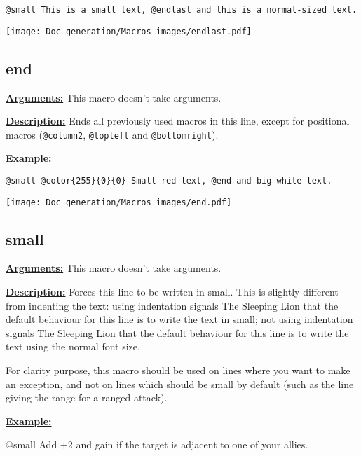 \documentclass{article}
\begin{document}
\begin{BVerbatim}
@small This is a small text, @endlast and this is a normal-sized text.
\end{BVerbatim}

\begin{center}
\texttt{[image: Doc\_generation/Macros\_images/endlast.pdf]}
\end{center}

\subsection{end}
\textbf{\underline{Arguments:}} This macro doesn't take arguments.

\textbf{\underline{Description:}} Ends all previously used macros in this line, except for positional macros (\verb`@column2`, \verb`@topleft` and \verb`@bottomright`). 

\textbf{\underline{Example:}}

\begin{center}
\begin{BVerbatim}
@small @color{255}{0}{0} Small red text, @end and big white text.
\end{BVerbatim}

\texttt{[image: Doc\_generation/Macros\_images/end.pdf]}
\end{center}


\subsection{small}
\textbf{\underline{Arguments:}} This macro doesn't take arguments.

\textbf{\underline{Description:}} Forces this line to be written in small. This is slightly different from indenting the text: using indentation signals The Sleeping Lion that the default behaviour for this line is to write the text in small; not using indentation signals The Sleeping Lion that the default behaviour for this line is to write the text using the normal font size. 

For clarity purpose, this macro should be used on lines where you want to make an exception, and not on lines which should be small by default (such as the line giving the range for a ranged attack).

\textbf{\underline{Example:}}

\begin{spverbatim}
@small Add +2  and gain  if the target is adjacent to one of your allies.
\end{spverbatim}
\end{document}
